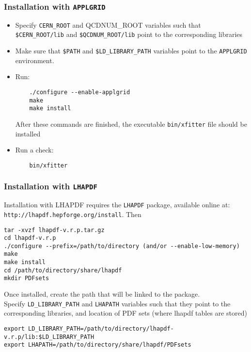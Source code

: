 \subsubsection{Installation with {\tt APPLGRID}}
\begin{itemize}
\item
 Specify {\tt CERN\_ROOT} and {QCDNUM\_ROOT} variables such that\\
     \verb'$CERN_ROOT/lib' and \verb'$QCDNUM_ROOT/lib'
 point to the corresponding libraries
\item Make sure that {\tt \$PATH} and {\tt \$LD\_LIBRARY\_PATH} 
variables point to the {\tt APPLGRID} environment.
\item Run:
\begin{verbatim}
    ./configure --enable-applgrid
    make 
    make install
\end{verbatim}
After these commands are finished, the executable {\tt bin/xfitter} 
file should be installed
\item  Run a check:
\begin{verbatim}
    bin/xfitter 
\end{verbatim}
\end{itemize}
\subsubsection{Installation with {\tt LHAPDF}}\label{sec:install_lhapdf}

Installation with LHAPDF requires the {\tt LHAPDF} package, available online at:\\
{\tt http://lhapdf.hepforge.org/install}.
Then
\begin{verbatim}
tar -xvzf lhapdf-v.r.p.tar.gz
cd lhapdf-v.r.p
./configure --prefix=/path/to/directory (and/or --enable-low-memory)
make
make install
cd /path/to/directory/share/lhapdf
mkdir PDFsets
\end{verbatim}

Once installed, create the path that will be linked to the \fitter package.\\
 Specify \verb'LD_LIBRARY_PATH'
     and {\tt LHAPATH} variables such that they
 point to the corresponding libraries, and location of PDF sets (where lhapdf tables are stored)
\begin{verbatim}
export LD_LIBRARY_PATH=/path/to/directory/lhapdf-v.r.p/lib:$LD_LIBRARY_PATH
export LHAPATH=/path/to/directory/share/lhapdf/PDFsets
\end{verbatim}



